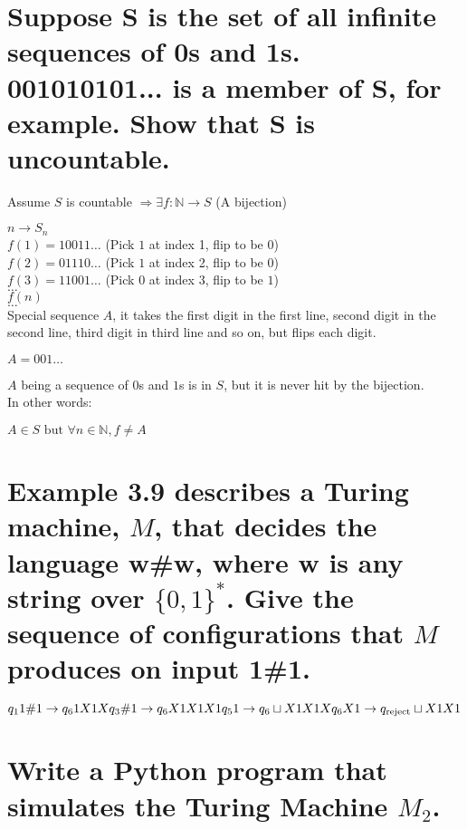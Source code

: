 \documentclass{article}
\begin{document}
\section{Suppose S is the set of all infinite sequences of 0s and 1s. 001010101... is a member of S, for example. Show that S is uncountable.}

Assume $S$ is countable $\Rightarrow \exists \mathit{f}: \mathbb{N} \rightarrow S$ (A bijection)

$n \rightarrow S_n$ \\
$\mathit{f}(1) = 10011 \dots$ (Pick $1$ at index 1, flip to be $0$) \\
$\mathit{f}(2) = 01110 \dots$ (Pick $1$ at index 2, flip to be $0$) \\
$\mathit{f}(3) = 11001 \dots$ (Pick $0$ at index 3, flip to be $1$) \\
$\dots$ \\
$\mathit{f}(n)$ \\
$\dots$ \\

Special sequence $A$, it takes the first digit in the first line, second digit in the second line, third digit in third line and so on, but flips each digit.

$A = 001 \dots$

$A$ being a sequence of $0$s and $1$s is in $S$, but it is never hit by the bijection. \\
In other words:

$A \in S \text{ but } \forall n \in \mathbb{N}, \mathit{f} \neq A$

\section{Example 3.9 describes a Turing machine, $M$, that decides the language w\#w, where w is any string over $\{0,1\}^*$. Give the sequence of configurations that $M$ produces on input 1\#1.}

$
    q_1 1\#1 \rightarrow q_6 1X1 \\
    X q_3 \#1 \rightarrow q_6 X1X1 \\
    X 1 q_5 1 \rightarrow q_6 \sqcup X1X1 \\
    X q_6 X 1 \rightarrow q_{\text{reject}} \sqcup X1X1
$

\section{Write a Python program that simulates the Turing Machine $M_2$.}
\end{document}
